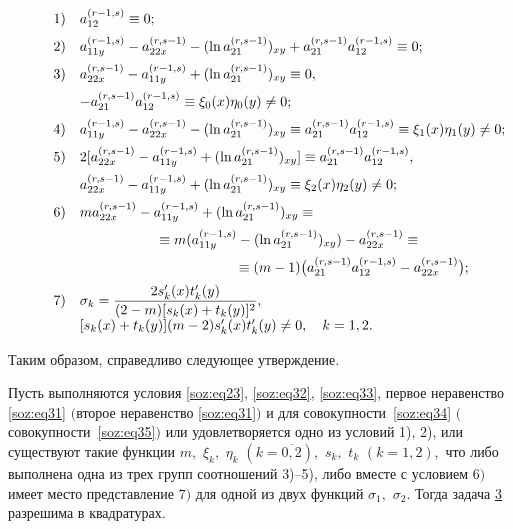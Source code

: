 \begin{equation}
\label{soz:eq35}
\begin{array}{ll}
1) & a_{12}^{(r-1,s)}\equiv0; 
\\[2mm]
2) & a_{11y}^{(r-1,s)}-a_{22x}^{(r,s-1)}-(\ln a_{21}^{(r,s-1)})_{xy}+a_{21}^{(r,s-1)}a_{12}^{(r-1,s)}\equiv0;  
\\[2mm]
3) & a_{22x}^{(r,s-1)}-a_{11y}^{(r-1,s)}+(\ln a_{21}^{(r,s-1)})_{xy}\equiv0,
\\[2mm]
   & -a_{21}^{(r,s-1)}a_{12}^{(r-1,s)}\equiv\xi_{0}(x)\eta_{0}(y)\neq0;
\\[2mm]
4) & a_{11y}^{(r-1,s)}-a_{22x}^{(r,s-1)}-(\ln a_{21}^{(r,s-1)})_{xy}\equiv a_{21}^{(r,s-1)}a_{12}^{(r-1,s)}\equiv\xi_{1}(x)\eta_{1}(y)\neq0;
\\[2mm]
5) & 2[a_{22x}^{(r,s-1)}-a_{11y}^{(r-1,s)}+(\ln a_{21}^{(r,s-1)})_{xy}]\equiv a_{21}^{(r,s-1)}a_{12}^{(r-1,s)},
\\[2mm]
   & a_{22x}^{(r,s-1)}-a_{11y}^{(r-1,s)}+(\ln a_{21}^{(r,s-1)})_{xy}\equiv\xi_{2}(x)\eta_{2}(y)\neq0;
\\[2mm]
6) & ma_{22x}^{(r,s-1)}-a_{11y}^{(r-1,s)}+(\ln a_{21}^{(r,s-1)})_{xy}\equiv
\\[2mm]
   & \hspace{2cm} \equiv m(a_{11y}^{(r-1,s)}-(\ln a_{21}^{(r,s-1)})_{xy})-a_{22x}^{(r,s-1)}\equiv
\\[2mm]
   & \hspace{4cm} \equiv(m-1)    \bigl(a_{21}^{(r,s-1)}a_{12}^{(r-1,s)}-a_{22x}^{(r,s-1)}\bigr);
\\[2mm]
7) & \sigma_{k}=\dfrac{2s' _{k}(x)t' _{k}(y)}{(2-m)[s_{k}(x)+t_{k}(y)]^{2}},
\\[2mm]
   & [s_{k}(x)+t_{k}(y)](m-2)s' _{k}(x)t' _{k}(y)\neq0,\quad  k=1,2. 
\end{array} 
\hspace{-1cm}
\end{equation}

\smallskip

Таким образом, справедливо следующее утверждение.

\medskip
\hypertarget{soz:th7}{}
\begin{theorem}[7]Пусть выполняются условия {\rm \eqref{soz:eq23}, \eqref{soz:eq32}, \eqref{soz:eq33}, } первое неравенство \eqref{soz:eq31} $($второе неравенство \eqref{soz:eq31}$)$ и для совокупности~\eqref{soz:eq34} $($совокуп\-нос\-ти~\eqref{soz:eq35}$)$ или удовлетворяется  одно из условий {\rm 1), 2),} 
или существуют такие функции $m,$ $\xi_{k},$  $\eta_{k}$ $(k=\overline{0, 2}),$ $s_{k},$ $t_{k}$ $(k=1, 2),$
что либо выполнена одна из трех групп соотношений {\rm 3)--5),}
либо вместе с условием $6)$ имеет место представление $7)$ для одной из двух функций $\sigma_{1},$ $\sigma_{2}.$ Тогда задача \hyperlink{soz:task3}{\rm 3}  разрешима в квадратурах.
\end{theorem}

